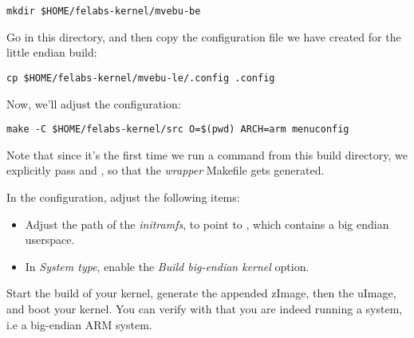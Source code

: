 \begin{verbatim}
mkdir $HOME/felabs-kernel/mvebu-be
\end{verbatim}

Go in this directory, and then copy the configuration file we have
created for the little endian build:

\begin{verbatim}
cp $HOME/felabs-kernel/mvebu-le/.config .config
\end{verbatim}

Now, we'll adjust the configuration:

\begin{verbatim}
make -C $HOME/felabs-kernel/src O=$(pwd) ARCH=arm menuconfig
\end{verbatim}

Note that since it's the first time we run a  command from
this build directory, we explicitly pass  and , so
that the {\em wrapper} Makefile gets generated.

In the configuration, adjust the following items:

\begin{itemize}
\item Adjust the path of the {\em initramfs}, to point to
  , which
  contains a big endian userspace.
\item In {\em System type}, enable the {\em Build big-endian kernel}
  option.
\end{itemize}

Start the build of your kernel, generate the appended zImage, then the
uImage, and boot your kernel. You can verify with  that
you are indeed running a  system, i.e a big-endian ARM
system.
